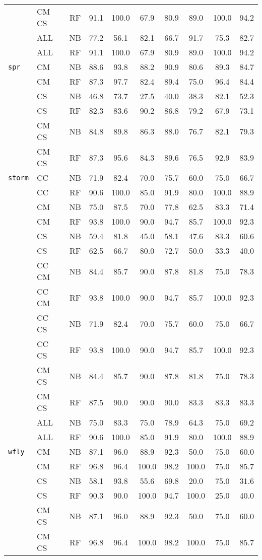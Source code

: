 {\begin{tabular}{l l c | c | c c c | c c c}
& CM CS & RF & 91.1 & 100.0 & 67.9 & 80.9 & 89.0 & 100.0 & 94.2 \\
& ALL & NB & 77.2 & 56.1 & 82.1 & 66.7 & 91.7 & 75.3 & 82.7 \\
& ALL & RF & 91.1 & 100.0 & 67.9 & 80.9 & 89.0 & 100.0 & 94.2 \\
{\tt spr}
& CM & NB & 88.6 & 93.8 & 88.2 & 90.9 & 80.6 & 89.3 & 84.7 \\
& CM & RF & 87.3 & 97.7 & 82.4 & 89.4 & 75.0 & 96.4 & 84.4 \\
& CS & NB & 46.8 & 73.7 & 27.5 & 40.0 & 38.3 & 82.1 & 52.3 \\
& CS & RF & 82.3 & 83.6 & 90.2 & 86.8 & 79.2 & 67.9 & 73.1 \\
& CM CS & NB & 84.8 & 89.8 & 86.3 & 88.0 & 76.7 & 82.1 & 79.3 \\
& CM CS & RF & 87.3 & 95.6 & 84.3 & 89.6 & 76.5 & 92.9 & 83.9 \\
{\tt storm}
& CC & NB & 71.9 & 82.4 & 70.0 & 75.7 & 60.0 & 75.0 & 66.7 \\
& CC & RF & 90.6 & 100.0 & 85.0 & 91.9 & 80.0 & 100.0 & 88.9 \\
& CM & NB & 75.0 & 87.5 & 70.0 & 77.8 & 62.5 & 83.3 & 71.4 \\
& CM & RF & 93.8 & 100.0 & 90.0 & 94.7 & 85.7 & 100.0 & 92.3 \\
& CS & NB & 59.4 & 81.8 & 45.0 & 58.1 & 47.6 & 83.3 & 60.6 \\
& CS & RF & 62.5 & 66.7 & 80.0 & 72.7 & 50.0 & 33.3 & 40.0 \\
& CC CM & NB & 84.4 & 85.7 & 90.0 & 87.8 & 81.8 & 75.0 & 78.3 \\
& CC CM & RF & 93.8 & 100.0 & 90.0 & 94.7 & 85.7 & 100.0 & 92.3 \\
& CC CS & NB & 71.9 & 82.4 & 70.0 & 75.7 & 60.0 & 75.0 & 66.7 \\
& CC CS & RF & 93.8 & 100.0 & 90.0 & 94.7 & 85.7 & 100.0 & 92.3 \\
& CM CS & NB & 84.4 & 85.7 & 90.0 & 87.8 & 81.8 & 75.0 & 78.3 \\
& CM CS & RF & 87.5 & 90.0 & 90.0 & 90.0 & 83.3 & 83.3 & 83.3 \\
& ALL & NB & 75.0 & 83.3 & 75.0 & 78.9 & 64.3 & 75.0 & 69.2 \\
& ALL & RF & 90.6 & 100.0 & 85.0 & 91.9 & 80.0 & 100.0 & 88.9 \\
{\tt wfly}
& CM & NB & 87.1 & 96.0 & 88.9 & 92.3 & 50.0 & 75.0 & 60.0 \\
& CM & RF & 96.8 & 96.4 & 100.0 & 98.2 & 100.0 & 75.0 & 85.7 \\
& CS & NB & 58.1 & 93.8 & 55.6 & 69.8 & 20.0 & 75.0 & 31.6 \\
& CS & RF & 90.3 & 90.0 & 100.0 & 94.7 & 100.0 & 25.0 & 40.0 \\
& CM CS & NB & 87.1 & 96.0 & 88.9 & 92.3 & 50.0 & 75.0 & 60.0 \\
& CM CS & RF & 96.8 & 96.4 & 100.0 & 98.2 & 100.0 & 75.0 & 85.7 \\
\bottomrule
\end{tabular}
}
